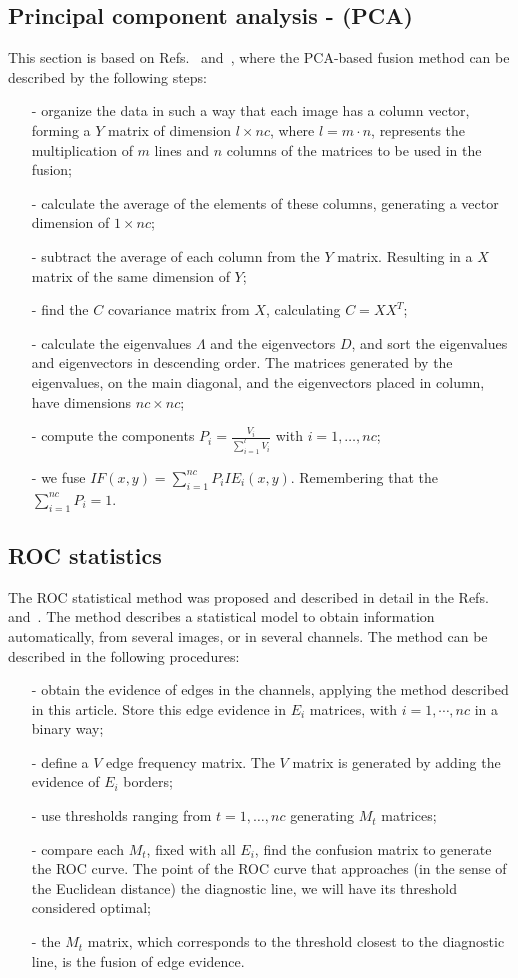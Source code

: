 \documentclass[conference]{IEEEtran}
\begin{document}
\subsection{Principal component analysis - (PCA) }
This section is based on Refs.~\cite{n_r} and~\cite{mit}, where the PCA-based fusion method can be described by the following steps:
\begin{itemize}
\item[-] organize the data in such a way that each image has a column vector, forming a $Y$ matrix of dimension $l\times nc$, where $l=m\cdot n$, represents the multiplication of $m$ lines and $n$ columns of the matrices to be used in the fusion;
\item[-] calculate the average of the elements of these columns, generating a vector dimension of $1\times nc$;
\item[-] subtract the average of each column from the $Y$ matrix. Resulting in a $X$ matrix of the same dimension of $Y$; 
\item[-] find the $C$ covariance matrix from $X$, calculating $C=XX^T$;
\item[-] calculate the eigenvalues $\Lambda$ and the eigenvectors $D$, and sort the eigenvalues and eigenvectors in descending order. The matrices generated by the eigenvalues, on the main diagonal, and the eigenvectors placed in column, have dimensions $nc\times nc$;
\item[-] compute the components $P_i=\frac{V_i}{\sum_{i=1}^l V_i}$ with $i=1,\dots,nc$;
\item[-] we fuse $IF(x,y)=\sum_{i=1}^{nc}P_iIE_i(x,y)$. Remembering that the $\sum_{i=1}^{nc}P_i=1$.
\end{itemize}

\subsection{ROC statistics}
The ROC statistical method was proposed and described in detail in the Refs.~\cite{gs} and~\cite{fawcett}. The method describes a statistical model to obtain information automatically, from several images, or in several channels. The method can be described in the following procedures:
\begin{itemize}
\item[-] obtain the evidence of edges in the channels, applying the method described in this article. Store this edge evidence in $E_i$ matrices, with $i=1,\cdots,nc$ in a binary way;
\item[-] define a $V$ edge frequency matrix. The $V$ matrix is generated by adding the evidence of $E_i$ borders;
\item[-] use thresholds ranging from $t=1,\dots,nc$ generating $M_t$ matrices;
\item[-] compare each $M_t$, fixed with all $E_i$, find the confusion matrix to generate the ROC curve. The point of the ROC curve that approaches (in the sense of the Euclidean distance) the diagnostic line, we will have its threshold considered optimal;
\item[-] the $M_t$ matrix, which corresponds to the threshold closest to the diagnostic line, is the fusion of edge evidence.
\end{itemize}
\end{document}
